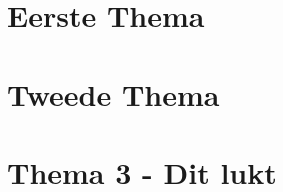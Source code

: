 \documentclass{xourse}
\begin{document}
\author{Ingmar Herreman} 

\begin{abstract}
Dit is een testmodule om de KU Leuven-layout uit te proberen.
\end{abstract}

\part{Eerste Thema}









\part{Tweede Thema}


\part{Thema 3 - Dit lukt}
\end{document}
